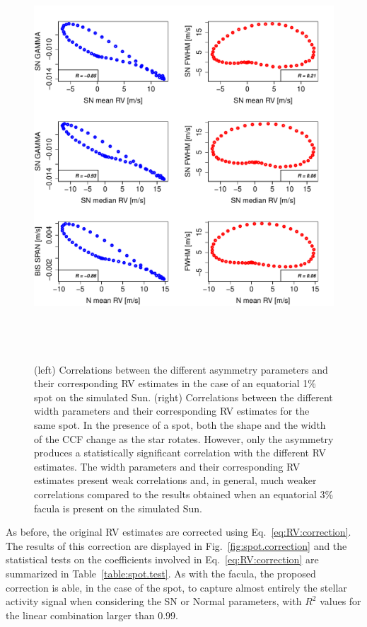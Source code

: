 \documentclass{aa}
\begin{document}
\begin{figure}[htbp]
\begin{center}
\includegraphics[height = 6in]{SOAP_SPOT_Comparison_para_SN.pdf} 
   \caption{(left) Correlations between the different asymmetry parameters and their corresponding RV estimates in the case of an equatorial 1\% spot on the simulated Sun. (right) Correlations between the different width parameters and their corresponding RV estimates for the same spot. In the presence of a spot, both the shape and the width of the CCF change as the star rotates. However, only the asymmetry produces a statistically significant correlation with the different RV estimates. The width parameters and their corresponding RV estimates present weak correlations and, in general, much weaker correlations compared to the results obtained when an equatorial 3\% facula is present on the simulated Sun.}
    \label{fig:spot.corr}
\end{center}
\end{figure}

As before, the original RV estimates are corrected using Eq.~\eqref{eq:RV:correction}. 
The results of this correction are displayed in Fig.~\ref{fig:spot.correction} and the statistical tests on the coefficients involved in Eq.~\eqref{eq:RV:correction} are summarized in Table~\ref{table:spot.test}. 
As with the facula, the proposed correction is able, in the case of the spot, to capture almost entirely the stellar activity signal when considering the SN or Normal parameters, with $R^2$ values for the linear combination larger than 0.99. 
\end{document}
